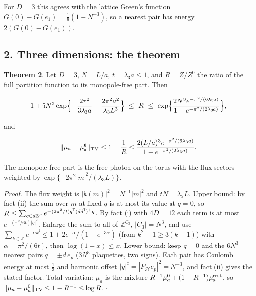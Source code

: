 \documentclass[11pt,a4paper]{article}
\begin{document}
For \(D=3\) this agrees with the lattice Green's function:
\(G(0)-G(e_1)=\frac16(1-N^{-3})\), so a nearest pair has energy
\(2(G(0)-G(e_1))\).

\hypertarget{three-dimensions-the-theorem}{%
\subsection{2. Three dimensions: the
theorem}\label{three-dimensions-the-theorem}}

\textbf{Theorem 2.} Let \(D=3\), \(N=L/a\), \(t=\lambda_3a\le1\), and
\(R=Z/Z^0\) the ratio of the full partition function to its
monopole-free part. Then

\[1+6N^3\exp\Bigl\{-\frac{2\pi^2}{3\lambda_3a}
-\frac{2\pi^2a^2}{\lambda_3L^3}\Bigr\}\ \le\ R\ \le\
\exp\Bigl\{\frac{2N^3e^{-\pi^2/(6\lambda_3a)}}{1-e^{-\pi^2/(2\lambda_3a)}}\Bigr\},\]

and

\[\|\mu_a-\mu_a^0\|_{\rm TV}\le1-\frac1R\le
\frac{2(L/a)^3e^{-\pi^2/(6\lambda_3a)}}{1-e^{-\pi^2/(2\lambda_3a)}}.\]

The monopole-free part is the free photon on the torus with the flux
sectors weighted by \(\exp\{-2\pi^2|m|^2/(\lambda_3L)\}\).

\emph{Proof.} The flux weight is \(|h(m)|^2=N^{-1}|m|^2\) and
\(tN=\lambda_3L\). Upper bound: by fact (ii) the sum over \(m\) at fixed
\(q\) is at most its value at \(q=0\), so
\(R\le\sum_{q\in d\mathbb Z^P} e^{-(2\pi^2/t)q^{\sf T}(dd^{\sf T})^+q}\).
By fact (i) with \(4D=12\) each term is at most
\(e^{-(\pi^2/6t)|q|^2}\). Enlarge the sum to all of \(\mathbb Z^{C_3}\),
\(|C_3|=N^3\), and use
\(\sum_{k\in\mathbb Z}e^{-\alpha k^2}\le1+2e^{-\alpha}/(1-e^{-3\alpha})\)
(from \(k^2-1\ge3(k-1)\)) with \(\alpha=\pi^2/(6t)\), then
\(\log(1+x)\le x\). Lower bound: keep \(q=0\) and the \(6N^3\) nearest
pairs \(q=\pm d\,e_p\) (\(3N^3\) plaquettes, two signs). Each pair has
Coulomb energy at most \(\frac13\) and harmonic offset
\(|y|^2=|P_{\mathcal H}e_p|^2=N^{-3}\), and fact (ii) gives the stated
factor. Total variation: \(\mu_a\) is the mixture
\(R^{-1}\mu_a^0+(1-R^{-1})\mu_a^{\rm rest}\), so
\(\|\mu_a-\mu_a^0\|_{\rm TV}\le1-R^{-1}\le\log R\). \(\square\)
\end{document}
